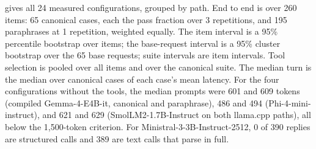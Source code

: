 \documentclass[11pt]{article}
\begin{document}
 gives all 24 measured configurations, grouped by path. End to end is over 260 items: 65 canonical cases, each the pass fraction over 3 repetitions, and 195 paraphrases at 1 repetition, weighted equally. The item interval is a 95\% percentile bootstrap over items; the base-request interval is a 95\% cluster bootstrap over the 65 base requests; suite intervals are item intervals. Tool selection is pooled over all items and over the canonical suite. The median turn is the median over canonical cases of each case's mean latency. For the four configurations without the tools, the median prompts were 601 and 609 tokens (compiled Gemma-4-E4B-it, canonical and paraphrase), 486 and 494 (Phi-4-mini-instruct), and 621 and 629 (SmolLM2-1.7B-Instruct on both llama.cpp paths), all below the 1,500-token criterion. For Ministral-3-3B-Instruct-2512, 0 of 390 replies are structured calls and 389 are text calls that parse in full.
\end{document}
